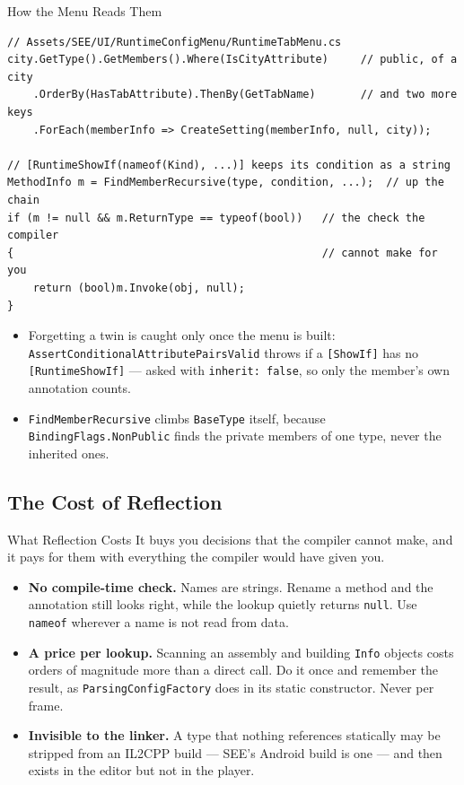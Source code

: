 \begin{frame}[fragile]{How the Menu Reads Them}
  \begin{lstlisting}[basicstyle=\scriptsize\ttfamily]
// Assets/SEE/UI/RuntimeConfigMenu/RuntimeTabMenu.cs
city.GetType().GetMembers().Where(IsCityAttribute)     // public, of a city
    .OrderBy(HasTabAttribute).ThenBy(GetTabName)       // and two more keys
    .ForEach(memberInfo => CreateSetting(memberInfo, null, city));

// [RuntimeShowIf(nameof(Kind), ...)] keeps its condition as a string
MethodInfo m = FindMemberRecursive(type, condition, ...);  // up the chain
if (m != null && m.ReturnType == typeof(bool))   // the check the compiler
{                                                // cannot make for you
    return (bool)m.Invoke(obj, null);
}
  \end{lstlisting}
  \vspace{1ex}

  \begin{itemize}
    \item Forgetting a twin is caught only once the menu is built:
      \texttt{AssertConditionalAttributePairsValid} throws if a
      \texttt{[ShowIf]} has no \texttt{[RuntimeShowIf]} --- asked with
      \texttt{inherit: false}, so only the member's own annotation counts.
    \item \texttt{FindMemberRecursive} climbs \texttt{BaseType} itself, because
      \texttt{BindingFlags.NonPublic} finds the private members of one type,
      never the inherited ones.
  \end{itemize}
\end{frame}

\subsection{The Cost of Reflection}

\begin{frame}{What Reflection Costs}
  It buys you decisions that the compiler cannot make, and it pays for them
  with everything the compiler would have given you.
  \vspace{1ex}

  \begin{itemize}
    \item \textbf{No compile-time check.} Names are strings. Rename a method
      and the annotation still looks right, while the lookup quietly returns
      \texttt{null}. Use \texttt{nameof} wherever a name is not read from data.
    \item \textbf{A price per lookup.} Scanning an assembly and building
      \texttt{Info} objects costs orders of magnitude more than a direct call.
      Do it once and remember the result, as
      \texttt{ParsingConfigFactory} does in its static constructor. Never per
      frame.
    \item \textbf{Invisible to the linker.} A type that nothing references
      statically may be stripped from an IL2CPP build --- SEE's Android build
      is one --- and then exists in the editor but not in the player.
  \end{itemize}
\end{frame}

